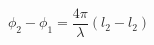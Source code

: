   \begin{equation}
    \phi_2 - \phi_1 = \frac{4 \pi}{\lambda} \left(l_2 - l_2\right)
  \end{equation}

